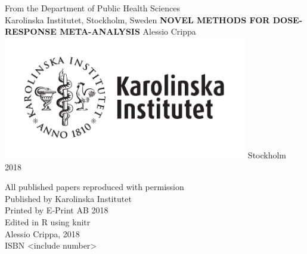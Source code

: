 \documentclass[11pt,a4paper,twoside,openany]{book}\usepackage{knitr}
\begin{document}
\frontmatter
\pagestyle{nothing}

%

\begin{titlepage}
\begin{center}
\large
From the Department of Public Health Sciences \\
Karolinska Institutet, Stockholm, Sweden        
\vfill
\Large
\textbf{\textsf{NOVEL METHODS FOR DOSE-RESPONSE META-ANALYSIS}}
\vfill
\Large
Alessio Crippa
\vfill
\includegraphics[width=0.8\textwidth]{figures/ki-logo_pos}
\vfill
\large
Stockholm 2018        
\end{center}
\restoregeometry
\end{titlepage}

\newpage
\null
\vfill
\noindent All published papers reproduced with permission \\
Published by Karolinska Institutet \\
\bigskip
Printed by E-Print AB 2018 \\
Edited in R using knitr \\
\textcopyright Alessio Crippa, 2018 \\
ISBN <include number>
\newpage
\end{document}
